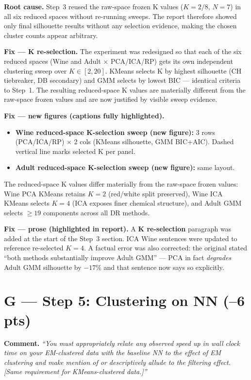 \documentclass[letterpaper, 10.5pt]{article}
\begin{document}
\textbf{Root cause.} Step~3 reused the raw-space frozen K values ($K\!=\!2/8$,
$N\!=\!7$) in all six reduced spaces without re-running sweeps.  The report
therefore showed only final silhouette results without any selection evidence,
making the chosen cluster counts appear arbitrary.

\textbf{Fix --- K re-selection.}
The experiment was redesigned so that each of the six reduced spaces
(Wine and Adult $\times$ PCA/ICA/RP) gets its own independent clustering
sweep over $K\in[2,20]$.  KMeans selects K by highest silhouette (CH
tiebreaker, DB secondary) and GMM selects by lowest BIC --- identical
criteria to Step~1.  The resulting reduced-space K values are materially
different from the raw-space frozen values and are now justified by
visible sweep evidence.

\textbf{Fix --- new figures (captions fully highlighted).}
\begin{itemize}
  \item \textbf{Wine reduced-space K-selection sweep (new figure):}
        3 rows (PCA/ICA/RP) $\times$ 2 cols (KMeans silhouette, GMM
        BIC+AIC).  Dashed vertical line marks selected K per panel.
  \item \textbf{Adult reduced-space K-selection sweep (new figure):}
        same layout.
\end{itemize}

The reduced-space K values differ materially from the raw-space frozen
values: Wine PCA KMeans retains $K\!=\!2$ (red/white split preserved), Wine
ICA KMeans selects $K\!=\!4$ (ICA exposes finer chemical structure), and
Adult GMM selects $\geq\!19$ components across all DR methods.

\textbf{Fix --- prose (highlighted in report).}
A \textbf{K re-selection} paragraph was added at the start of the Step~3
section.  ICA Wine sentences were updated to reference re-selected
$K\!=\!4$.  A factual error was also corrected: the original stated ``both
methods substantially improve Adult GMM'' --- PCA in fact \emph{degrades}
Adult GMM silhouette by $-17\%$ and that sentence now says so explicitly.

\section*{G --- Step 5: Clustering on NN (--6 pts)}

\textbf{Comment.} \textit{``You must appropriately relate any observed speed
up in wall clock time on your EM-clustered data with the baseline NN to the
effect of EM clustering and make mention of or descriptively allude to the
filtering effect.  [Same requirement for KMeans-clustered data.]''}
\end{document}
